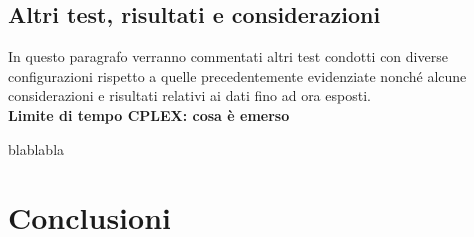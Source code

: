 \documentclass[preprint,12pt]{elsarticle}
\begin{document}
\subsection{\textbf{Altri test, risultati e considerazioni}}

In questo paragrafo verranno commentati altri test condotti con diverse configurazioni rispetto a quelle precedentemente evidenziate nonché alcune considerazioni e risultati relativi ai dati fino ad ora esposti. \\

{\large \textbf{Limite di tempo CPLEX: cosa è emerso}}

blablabla

\section{Conclusioni}
\label{S:5}













\end{document}
